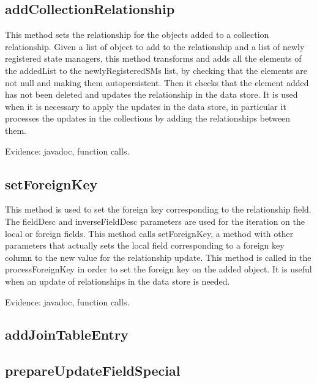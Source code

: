 \documentclass[18pt,oneside,a4paper, titlepage]{article}
\begin{document}
	\subsection{addCollectionRelationship}
		This method sets the relationship for the objects added to a collection relationship. Given a list of object to add to the relationship and a list of newly registered state managers, this method transforms and adds all the elements of the addedList to the newlyRegisteredSMs list, by checking that the elements are not null and making them autopersistent. Then it checks that the element added has not been deleted and updates the relationship in the data store.
		It is used when it is necessary to apply the updates in the data store, in particular it processes the updates in the collections by adding the relationships between them.
		
		Evidence: javadoc, function calls.
	\subsection{setForeignKey}
		This method is used to set the foreign key corresponding to the relationship field. The fieldDesc and inverseFieldDesc parameters are used for the iteration on the local or foreign fields. This method calls setForeignKey, a method with other parameters that actually sets the local field corresponding to a foreign key column to the new value for the relationship update.
		This method is called in the processForeignKey in order to set the foreign key on the added object. It is useful when an update of relationships in the data store is needed.
		
		Evidence: javadoc, function calls.
	\subsection{addJoinTableEntry}
	
	\subsection{prepareUpdateFieldSpecial}
	

\newpage
\end{document}
